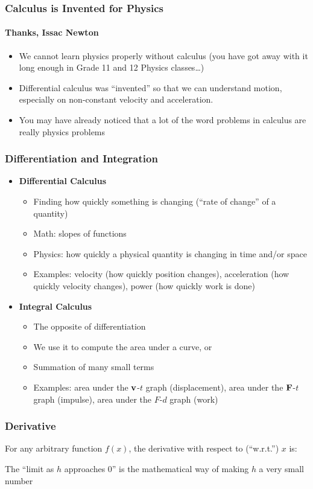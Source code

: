 \documentclass[12pt,compress,aspectratio=169]{beamer}
\newcommand{\mb}[1]{\ensuremath\mathbf{#1}}
\newcommand{\eq}[2]{\vspace{#1}{\Large\begin{displaymath}#2\end{displaymath}}}
\begin{document}
\begin{frame}
  \frametitle{Calculus is Invented for Physics}
  \framesubtitle{Thanks, Issac Newton}
  \begin{itemize}
  \item We cannot learn physics properly without calculus (you have got
    away with it long enough in Grade 11 and 12 Physics classes\ldots)
  \item Differential calculus was ``invented'' so that we can understand
    motion, especially on non-constant velocity and acceleration.
  \item You may have already noticed that a lot of the word problems in
    calculus are really physics problems
  \end{itemize}
\end{frame}

\begin{frame}
  \frametitle{Differentiation and Integration}
  \begin{itemize}
  \item\textbf{Differential Calculus}
    \begin{itemize}
    \item Finding how quickly something is changing (``rate of change'' of a
      quantity)
    \item Math: slopes of functions
    \item Physics: how quickly a physical quantity is changing in time and/or
      space
    \item Examples: velocity (how quickly position changes), acceleration
      (how quickly velocity changes), power (how quickly work is done)
    \end{itemize}
  \item\textbf{Integral Calculus}
    \begin{itemize}
    \item The opposite of differentiation
    \item We use it to compute the area under a curve, or
    \item Summation of many small terms
    \item Examples: area under the $\mb{v}$-$t$ graph (displacement), area
      under the $\mb{F}$-$t$ graph (impulse), area under the $F$-$d$ graph
      (work)
    \end{itemize}
  \end{itemize}
\end{frame}


\begin{frame}
  \frametitle{Derivative}
  For any arbitrary function $f(x)$, the derivative with respect to
  (``w.r.t.'') $x$ is:

  \eq{-.2in}{
    \boxed{f'(x)=\lim_{h\rightarrow 0}\frac{f(x+h)-f(x)}{h}}
  }

  The ``limit as $h$ approaches $0$'' is the mathematical way of making $h$
  a very small number
\end{frame}
\end{document}
